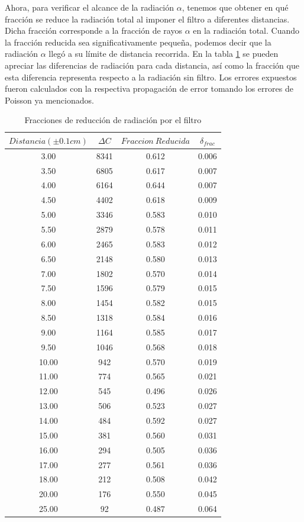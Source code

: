 \documentclass[%
 reprint,
 amsmath,amssymb,
 aps,
]{revtex4-1}
\begin{document}
Ahora, para verificar el alcance de la radiación $\alpha$, tenemos que obtener en qué fracción se reduce la radiación total al imponer el filtro a diferentes distancias. Dicha fracción corresponde a la fracción  de rayos $\alpha$ en la radiación total. Cuando la fracción reducida sea significativamente pequeña, podemos decir que la radiación $\alpha$ llegó a su límite de distancia recorrida. En la tabla \ref{table:fraccion} se pueden apreciar las diferencias de radiación para cada distancia, así como la fracción que esta diferencia representa respecto a la radiación sin filtro. Los errores expuestos fueron calculados con la respectiva propagación de error tomando los errores de Poisson ya mencionados.\\ 

\begin{table}[h!]
\centering
 \begin{tabular}{|c|c|c|c|} 
 \hline
 $Distancia(\pm0.1cm)$& $\Delta C$& $Fraccion\ Reducida$ & $\delta_{frac}$ \\ [0.5ex] 
 \hline\hline
3.00&8341&0.612&0.006\\
3.50&6805&0.617&0.007\\
4.00&6164&0.644&0.007\\
4.50&4402&0.618&0.009\\
5.00&3346&0.583&0.010\\
5.50&2879&0.578&0.011\\
6.00&2465&0.583&0.012\\
6.50&2148&0.580&0.013\\
7.00&1802&0.570&0.014\\
7.50&1596&0.579&0.015\\
8.00&1454&0.582&0.015\\
8.50&1318&0.584&0.016\\
9.00&1164&0.585&0.017\\
9.50&1046&0.568&0.018\\
10.00&942&0.570&0.019\\
11.00&774&0.565&0.021\\
12.00&545&0.496&0.026\\
13.00&506&0.523&0.027\\
14.00&484&0.592&0.027\\
15.00&381&0.560&0.031\\
16.00&294&0.505&0.036\\
17.00&277&0.561&0.036\\
18.00&212&0.508&0.042\\
20.00&176&0.550&0.045\\
25.00&92&0.487&0.064\\
 [1ex] 
 \hline
 \end{tabular}
 \caption{Fracciones de reducción de radiación por el filtro}
 \label{table:fraccion}
\end{table}
\end{document}
